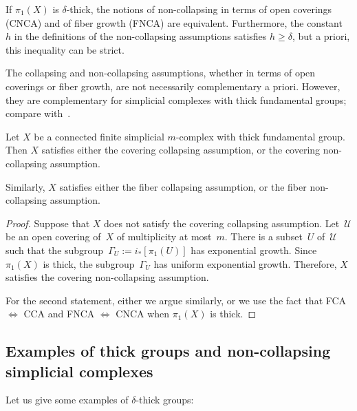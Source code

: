 \begin{remark}
If $\pi_1(X)$ is $\delta$-thick, the notions of non-collapsing in terms of open coverings (CNCA) and of fiber growth (FNCA) are equivalent.
Furthermore, the constant~$h$ in the definitions of the non-collapsing assumptions satisfies $h \geq \delta$, but a priori, this inequality can be strict.
\end{remark}

The collapsing and non-collapsing assumptions, whether in terms of open coverings or fiber growth, are not necessarily complementary a priori.
However, they are complementary for simplicial complexes with thick fundamental groups; compare with~\cite[Lem.\,3.8]{BC}.

\begin{proposition} \label{prop:alternative}
Let $X$ be a connected finite simplicial $m$\nobreakdash-complex with thick fundamental group.
Then $X$ satisfies either the covering collapsing assumption, or the covering non-collapsing assumption.

Similarly, $X$ satisfies either the fiber collapsing assumption, or the fiber non-collapsing assumption.
\end{proposition}

\begin{proof}
Suppose that $X$ does not satisfy the covering collapsing assumption.
Let~$\mathcal{U}$ be an open covering of~$X$ of multiplicity at most~$m$.
There is a subset~$U$ of~$\mathcal{U}$ such that the subgroup~$\Gamma_U := i_*[\pi_1(U)]$ has exponential growth.
Since $\pi_1(X)$ is thick, the subgroup~$\Gamma_{U}$ has uniform exponential growth.
Therefore, $X$ satisfies the covering non-collapsing assumption.

For the second statement, either we argue similarly, or we use the fact that FCA $\Leftrightarrow$ CCA and FNCA $\Leftrightarrow$ CNCA when $\pi_1(X)$ is thick.
\end{proof}

\subsection{Examples of thick groups and non-collapsing simplicial complexes} \label{sec:exthick}

Let us give some examples of $\delta$-thick groups:

